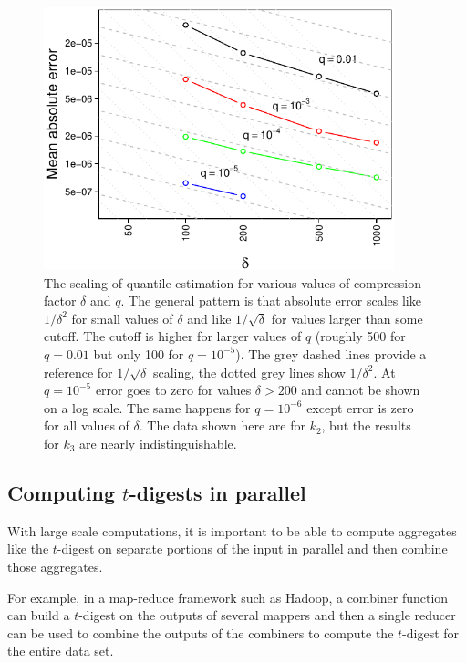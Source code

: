 \documentclass[]{statsoc}
\begin{document}
\begin{figure}[p] %
   \centering
   \includegraphics[width=4in]{error-vs-compression.pdf} 
   \caption{The scaling of quantile estimation for various values of compression factor $\delta$ and $q$. 
   The general pattern is that absolute error scales like $1/\delta^2$ for small values of $\delta$ and like $1/\sqrt{\delta}$ for values larger than some cutoff. The cutoff is higher for larger values of $q$ (roughly 500 for $q=0.01$ but only 100 for $q=10^{-5}$). The grey dashed lines provide a reference for $1/\sqrt{\delta}$ scaling, the dotted grey lines show $1/\delta^2$.   At $q=10^{-5}$ error goes to zero for values $\delta > 200$ and cannot be shown on a log scale. The same happens for $q=10^{-6}$ except error is zero for all values of $\delta$. The data shown here are for $k_2$, but the results for $k_3$ are nearly indistinguishable.}
   \label{fig:accuracy-scaling}
\end{figure}

\subsection{Computing $t$-digests in parallel}
With large scale computations, it is important to be able to compute aggregates like the $t$-digest on separate portions of the input in parallel and then combine those aggregates.  

For example, in a map-reduce framework such as Hadoop, a combiner function can build a $t$-digest on the outputs of several mappers and then a single reducer can be used to combine the outputs of the combiners to compute the $t$-digest for the entire data set.  
\end{document}
